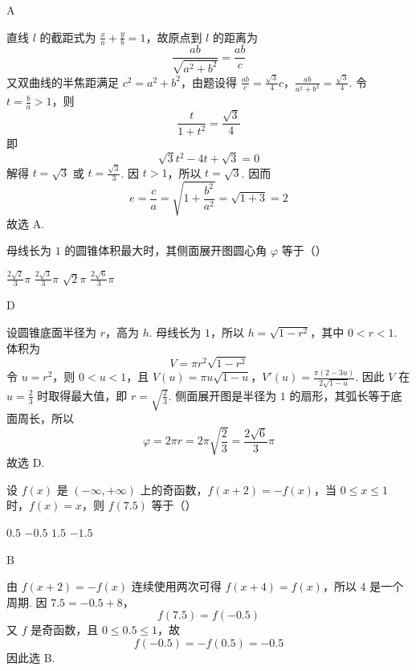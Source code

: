 \documentclass[UTF8,a4paper,oneside,11pt]{ctexbook}
\begin{document}
\begin{answer}
A
\end{answer}

\begin{solution}
直线 \(l\) 的截距式为 \(\frac{x}{a}+\frac{y}{b}=1\)，故原点到 \(l\) 的距离为
\[
\frac{ab}{\sqrt{a^2+b^2}}=\frac{ab}{c}
\]
又双曲线的半焦距满足 \(c^2=a^2+b^2\)，由题设得
\(\frac{ab}{c}=\frac{\sqrt3}{4}c\)，\(\frac{ab}{a^2+b^2}=\frac{\sqrt3}{4}\).
令 \(t=\frac{b}{a}>1\)，则
\[
\frac{t}{1+t^2}=\frac{\sqrt3}{4}
\]
即
\[
\sqrt3t^2-4t+\sqrt3=0
\]
解得 \(t=\sqrt3\) 或 \(t=\frac{\sqrt3}{3}\). 因 \(t>1\)，所以 \(t=\sqrt3\). 因而
\[
e=\frac ca=\sqrt{1+\frac{b^2}{a^2}}=\sqrt{1+3}=2
\]
故选 A.
\end{solution}

\begin{problem}
母线长为 \(1\) 的圆锥体积最大时，其侧面展开图圆心角 \(\varphi\) 等于（\quad）

\choices
    {\(\frac{2\sqrt{2}}{3}\pi\)}
    {\(\frac{2\sqrt{3}}{3}\pi\)}
    {\(\sqrt{2}\pi\)}
    {\(\frac{2\sqrt{6}}{3}\pi\)}
\end{problem}

\begin{answer}
D
\end{answer}

\begin{solution}
设圆锥底面半径为 \(r\)，高为 \(h\). 母线长为 \(1\)，所以 \(h=\sqrt{1-r^2}\)，其中 \(0<r<1\). 体积为
\[
V=\pi r^2\sqrt{1-r^2}
\]
令 \(u=r^2\)，则 \(0<u<1\)，且
\(V(u)=\pi u\sqrt{1-u}\)，\(V'(u)=\frac{\pi(2-3u)}{2\sqrt{1-u}}\).
因此 \(V\) 在 \(u=\frac23\) 时取得最大值，即 \(r=\sqrt{\frac23}\). 侧面展开图是半径为 \(1\) 的扇形，其弧长等于底面周长，所以
\[
\varphi=2\pi r=2\pi\sqrt{\frac23}=\frac{2\sqrt6}{3}\pi
\]
故选 D.
\end{solution}

\begin{problem}
设 \(f(x) \) 是 \((- \infty, + \infty)\) 上的奇函数，\(f(x + 2) = -f(x) \)，当 \(0 \leqslant x \leqslant 1 \) 时，\(f(x) = x\)，则 \(f(7.5)\) 等于（\quad）

\choices
    {\(0.5\)}
    {\(-0.5\)}
    {\(1.5\)}
    {\(-1.5\)}
\end{problem}

\begin{answer}
B
\end{answer}

\begin{solution}
由 \(f(x+2)=-f(x)\) 连续使用两次可得 \(f(x+4)=f(x)\)，所以 \(4\) 是一个周期. 因 \(7.5=-0.5+8\)，
\[
f(7.5)=f(-0.5)
\]
又 \(f\) 是奇函数，且 \(0\leqslant0.5\leqslant1\)，故
\[
f(-0.5)=-f(0.5)=-0.5
\]
因此选 B.
\end{solution}
\end{document}
